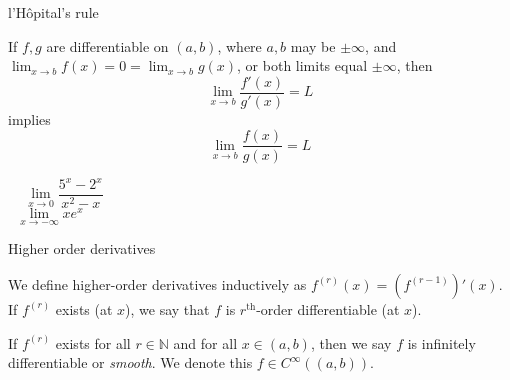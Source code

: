 \documentclass [aspectratio=169]{beamer}
\newcommand{\R}{{\mathbb{R}}}
\newcommand{\N}{{\mathbb{N}}}
\begin{document}
\begin{frame}

\end{frame}


%




\begin{frame}{l'H\^{o}pital's rule}
\begin{theorem}
If $f,g$ are differentiable on $(a,b)$, where $a,b$ may be $\pm \infty$, and $\lim_{x \to b} f(x) = 0 = \lim_{x \to b} g(x)$, or both limits equal $\pm \infty$, then 
$$ \lim_{x \to b} \frac{f'(x)}{g'(x)} = L$$
implies
$$ \lim_{x \to b} \frac{f(x)}{g(x)} = L$$
\end{theorem}
\end{frame}



\begin{frame}
\begin{example}
$$ \lim_{x\to 0} \frac{5^x - 2^x}{x^2-x} \qquad \qquad \qquad \qquad \qquad \qquad \qquad \qquad \qquad \qquad \qquad \qquad \qquad \qquad $$
\vspace{2cm}
$$ \lim_{x\to -\infty} x e^x \qquad \qquad \qquad \qquad \qquad \qquad \qquad \qquad \qquad \qquad \qquad \qquad \qquad \qquad \qquad $$
\vspace{2cm}
\end{example}
\end{frame}


\begin{frame}{Higher order derivatives}
\begin{definition}
We define higher-order derivatives inductively as $f^{(r)}(x) = (f^{(r-1)})'(x)$. If $f^{(r)}$ exists (at $x$), we say that $f$ is $r^\text{th}$-order differentiable (at $x$). 
\end{definition}

\vspace{1em}

\begin{definition}
If $f^{(r)}$ exists for all $r \in \N$ and for all $x \in (a,b)$, then we say $f$ is infinitely differentiable or \emph{smooth}. We denote this $f \in C^\infty((a,b))$.
\end{definition}
\end{frame}
\end{document}
